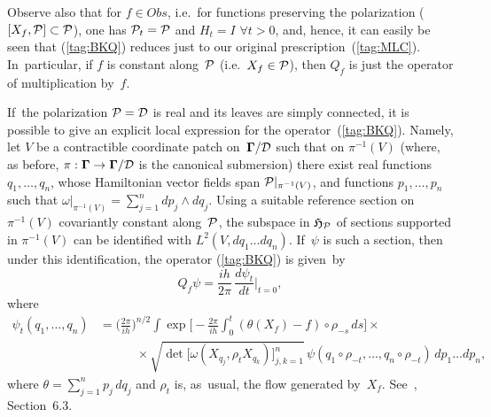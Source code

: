 \documentclass[12pt]{amsart}
\numberwithin{equation}{section}
\theoremstyle{remark}
\newcommand\Obs{Obs}
\newcommand\Omg{{\bigam}}   %
\newcommand\PP{{\Cal P}}
\newcommand\DD{{\Cal D}}
\newcommand\MD{{\Omg/\DD}}
\newcommand\HH{\mathfrak H}
\newcommand{\bigam}{\mbox{\boldmath $\Gamma$}}
\begin{document}
Observe also that for $f\in\Obs$, i.e.~for functions preserving the
polarization ($[X_f,\PP]\subset\PP$), one has $\PP_t=\PP$ and $H_t=I$ $\forall
t>0$, and, hence, it can easily be seen that (\ref{tag:BKQ}) reduces just to
our original prescription~(\ref{tag:MLC}). In~particular, if $f$ is constant
along~$\PP$ (i.e.~$X_f\in\PP$), then $Q_f$ is just the operator of
multiplication by~$f$.

If~the polarization $\PP=\DD$ is real and its leaves are simply connected, it
is possible to give an explicit local expression for the
operator~(\ref{tag:BKQ}). Namely, let $V$ be a contractible coordinate patch
on~$\MD$ such that on $\pi^{-1}(V)$ (where, as before, $\pi:\Omg\to\MD$ is the
canonical submersion) there exist real functions $q_1,\dots,q_n$, whose
Hamiltonian vector fields span $\PP|_{\pi^{-1}(V)}$, and functions
$p_1,\dots,p_n$ such that $\omega|_{\pi^{-1}(V)} = \sum_{j=1}^n dp_j\wedge
dq_j$. Using a suitable reference section on $\pi^{-1}(V)$ covariantly constant
along~$\PP$, the subspace in $\HH_\PP$ of sections supported in $\pi^{-1}(V)$
can be identified with $L^2(V,dq_1\dots dq_n)$. If~$\psi$ is such a section,
then under this identification, the operator (\ref{tag:BKQ}) is given~by
\begin{equation}  Q_f\psi = \frac{ih}{2\pi} \, \frac{d\psi_t}{dt} \bigg|_{t=0},
\label{tag:SNATa} \end{equation}
where
\begin{equation} \begin{aligned} \psi_t(q_1,\dots,q_n) &=
\bigg(\frac{2\pi}{ih}\bigg)^{n/2} \int
\exp\Big[-\frac{2\pi}{ih}\int_0^t (\theta(X_f)-f)\circ\rho_{-s}\,ds\Big]
\times {} \\ & \qquad\quad {}\times
\sqrt{\det\big[ \omega(X_{q_j},\rho_t X_{q_k}) \big]_{j,k=1}^n}
\,\psi(q_1\circ\rho_{-t},\dots,q_n\circ\rho_{-t}) \, dp_1 \dots dp_n,
\end{aligned}  \label{tag:SNATb}  \end{equation}
where $\theta=\sum_{j=1}^n p_j\,dq_j$ and $\rho_t$ is, as~usual, the flow
generated by~$X_f$. See~\cite{bib:SniaB}, Section~6.3.
\end{document}
